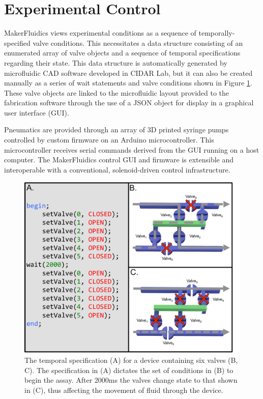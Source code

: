 \section{Experimental Control}
\label{sec:mfControl}
MakerFluidics views experimental conditions as a sequence of temporally-specified valve conditions. This necessitates a data structure consisting of an enumerated array of valve objects and a sequence of temporal specifications regarding their state. This data structure is automatically generated by microfluidic CAD software developed in CIDAR Lab, but it can also be created manually as a series of wait statements and valve conditions shown in Figure \ref{fig:sequence}. These valve objects are linked to the microfluidic layout provided to the fabrication software through the use of a JSON object for display in a graphical user interface (GUI).

Pneumatics are provided through an array of 3D printed syringe pumps controlled by custom firmware on an Arduino microcontroller. This microcontroller receives serial commands derived from the GUI running on a host computer. The MakerFluidics control GUI and firmware is extensible and interoperable with a conventional, solenoid-driven control infrastructure.


\begin{figure}[h]
  \begin{minipage}[t]{0.99\linewidth}\centering
    \includegraphics[width=14cm]{sequence.pdf}
    \medskip
  \end{minipage}\hfill
  \caption[Valving sequence temporal specification]{The temporal specification (A) \cite{thies2008} for a device containing six valves (B, C). The specification in (A) dictates the set of conditions in (B) to begin the assay. After 2000ms the valves change state to that shown in (C), thus affecting the movement of fluid through the device.}
    \label{fig:sequence}
\end{figure}

